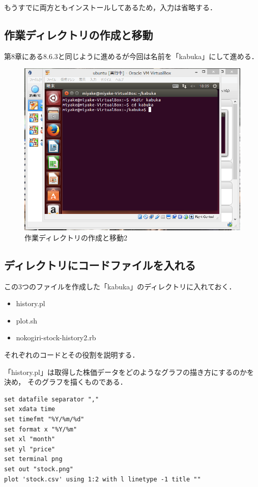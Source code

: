 もうすでに両方ともインストールしてあるため，入力は省略する．

\subsection{作業ディレクトリの作成と移動}

第8章にある8.6.3と同じように進めるが今回は名前を「kabuka」にして進める．

\begin{figure}[H]
\centering
\includegraphics[width=15cm]{kabukaidou.PNG}
\caption{作業ディレクトリの作成と移動2}\label{サンプル図}
\end{figure}

\subsection{ディレクトリにコードファイルを入れる}



この3つのファイルを作成した「kabuka」のディレクトリに入れておく．
\begin{itemize}
  \item history.pl
  \item plot.sh
  \item nokogiri-stock-history2.rb
\end{itemize}



それぞれのコードとその役割を説明する．



「history.pl」は取得した株価データをどのようなグラフの描き方にするのかを決め，
そのグラフを描くものである．
\begin{lstlisting}
set datafile separator ","
set xdata time
set timefmt "%Y/%m/%d"
set format x "%Y/%m"
set xl "month"
set yl "price"
set terminal png
set out "stock.png"
plot 'stock.csv' using 1:2 with l linetype -1 title ""

\end{lstlisting}

